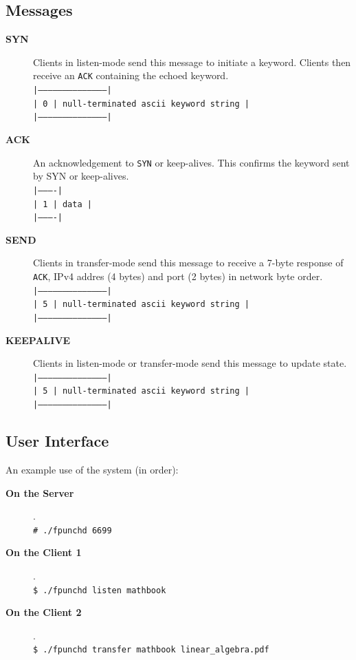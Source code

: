 \documentclass{article}
\begin{document}
\subsection{Messages}
\begin{description}
\item[\textbf{SYN}] Clients in listen-mode send this message to initiate a keyword. Clients then receive an \texttt{ACK} containing the echoed keyword.  \\
\texttt{|------------------------------------------| } \\
\texttt{| 0 | null-terminated ascii keyword string | } \\
\texttt{|------------------------------------------| } \\
\item[\textbf{ACK}] An acknowledgement to \texttt{SYN} or keep-alives.
This confirms the keyword sent by SYN or keep-alives. \\
\texttt{|----------| } \\
\texttt{| 1 | data | } \\
\texttt{|----------| } \\
\item[\textbf{SEND}] Clients in transfer-mode send this message to receive a 7-byte response of \texttt{ACK}, IPv4 addres (4 bytes) and port (2 bytes) in network byte order. \\
\texttt{|------------------------------------------| } \\
\texttt{| 5 | null-terminated ascii keyword string | } \\
\texttt{|------------------------------------------| } \\
\item[\textbf{KEEPALIVE}] Clients in listen-mode or transfer-mode send this message to update state. \\
\texttt{|------------------------------------------| } \\
\texttt{| 5 | null-terminated ascii keyword string | } \\
\texttt{|------------------------------------------| } \\
\end{description}

\clearpage
\subsection{User Interface}
An example use of the system (in order):
\begin{description}
\item[\textbf{On the Server}] . \\
\texttt{\# ./fpunchd 6699}

\item[\textbf{On the Client 1}] . \\
\texttt{\$ ./fpunchd listen mathbook}

\item[\textbf{On the Client 2}] . \\
\texttt{\$ ./fpunchd transfer mathbook linear\_algebra.pdf}
\end{description}
\end{document}
